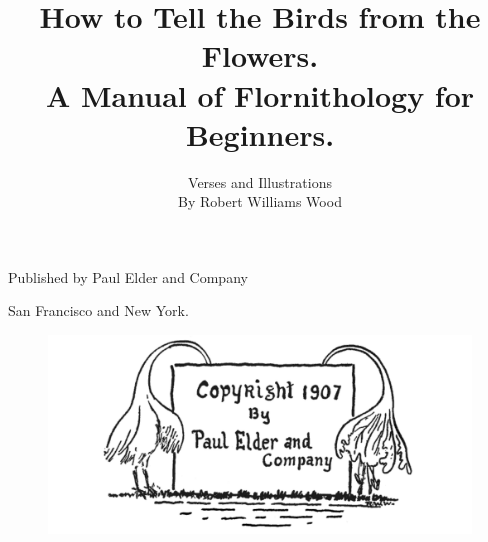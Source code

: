 \documentclass[letterpaper, 10pt, openany]{memoir}
\title{\Huge{How to Tell the Birds from the Flowers.\\}
\huge{A Manual of Flornithology for Beginners.}}
\author{Verses and Illustrations\\
By Robert Williams Wood}
\date{}
\begin{document}
\raggedright
\frontmatter
\maketitle
\vspace{\onelineskip}
\begin{center}
Published by Paul Elder and Company

San Francisco and New York.
\end{center}

\clearpage
\thispagestyle{plain}
\begin{figure}[b]
\includegraphics[width=1\textwidth]{f-p-ii.png}
\end{figure}

\clearpage
\thispagestyle{plain}
\tableofcontents*

\mainmatter
\end{document}
